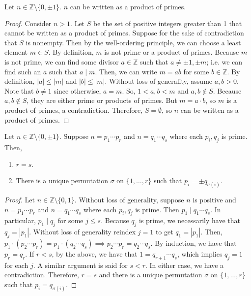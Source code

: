 \documentclass [12pt] {article}
\newcommand{\Z}{\mathbb{Z}}
\newenvironment{theorem}[1]{\begin{tcolorbox}[title={Theorem #1},colback=green!5!white,colframe=black!75!green]}{\end{tcolorbox}}
\begin{document}
\begin{theorem}{}
    Let $n \in \Z \setminus \{ 0, \pm 1 \}$. $n$ can be written as a product of primes.
\end{theorem}
\begin{proof}
    Consider $n > 1$. Let $S$ be the set of positive integers greater than 1 that cannot be written
    as a product of primes. Suppose for the sake of contradiction that $S$ is nonempty. Then by the
    well-ordering principle, we can choose a least element $m \in S$. By definition, $m$ is not
    prime or a product of primes. Because $m$ is not prime, we can find some divisor $a \in \Z$ such
    that $a \neq \pm 1, \pm m$; i.e. we can find such an $a$ such that $a \mid m$. Then, we can
    write $m = ab$ for some $b \in \Z$. By definition, $|a| \leq |m|$ and $|b| \leq |m|$. Without
    loss of generality, assume $a, b > 0$. Note that $b \neq 1$ since otherwise, $a = m$. So, 
    $1 < a, b < m$ and $a, b \not \in S$. Because $a, b \not \in S$, they are either prime or
    products of primes. But $m = a \cdot b$, so $m$ is a product of primes, a contradiction.
    Therefore, $S = \emptyset$, so $n$ can be written as a product of primes.
\end{proof}

\begin{theorem}{(Fundamental Theorem of Arithmetic)}
    Let $n \in \Z \setminus \{ 0, \pm 1 \}$. Suppose $n = p_1 \cdots p_r$ and $n = q_1 \cdots q_s$
    where each $p_i, q_j$ is prime. Then,
    \begin{enumerate}[label=(\arabic*)]
        \item $r = s$.
        \item There is a unique permutation $\sigma$ on $\{ 1, \ldots, r \}$ such that 
            $p_i = \pm q_{\sigma(i)}$.
    \end{enumerate}
\end{theorem}
\begin{proof}
    Let $n \in \Z \setminus \{ 0, 1 \}$. Without loss of generality, suppose $n$ is positive and 
    $n = p_1 \cdots p_r$ and $n = q_1 \cdots q_s$ where each $p_i, q_j$ is prime. Then $p_1 \mid q_1
    \cdots q_s$. In particular, $p_1 \mid q_j$ for some $j \leq s$. Because $q_j$ is prime, we
    necessarily have that $q_j = |p_1|$. Without loss of generality reindex  $j = 1$ to get 
    $q_1 = |p_1|$. Then,
    $
    p_1 \cdot (p_2 \cdots p_r) = p_1 \cdot (q_2 \cdots q_s)
    \implies 
    p_2 \cdots p_r = q_2 \cdots q_s
    $. By induction, we have that $p_r = q_r$. If $r < s$, by the above, we have that 
    $1 = q_{r + 1} \cdots q_s$, which implies $q_j = 1$ for each $j$. A similar argument is said for
    $s < r$. In either case, we have a contradiction. Therefore, $r = s$ and there is a unique
    permutation $\sigma$ on $\{ 1, \ldots, r \}$ such that $p_i = q_{\sigma(i)}$.
\end{proof}
\end{document}
